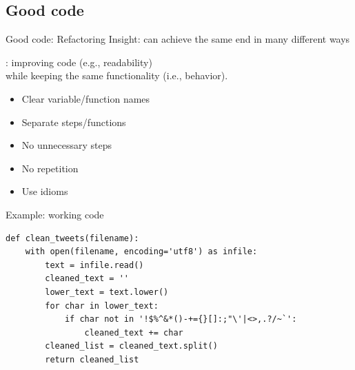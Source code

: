 \documentclass[aspectratio=169,usenames,dvipsnames]{beamer}
\begin{document}
\subsection{Good code}
\begin{frame}{Good code: Refactoring}
    Insight: can achieve the same end in many different ways

    \pause
    \begin{definition}
        : improving code (e.g., readability) \\
            while keeping the same functionality (i.e., behavior).
    \end{definition}

    \begin{itemize}
        \item Clear variable/function names
        \item Separate steps/functions
        \item No unnecessary steps
        \item No repetition
        \item Use idioms
    \end{itemize}
\end{frame}

\begin{frame}[fragile]{Example: working code}
\begin{lstlisting}
def clean_tweets(filename):
    with open(filename, encoding='utf8') as infile:
        text = infile.read()
        cleaned_text = ''
        lower_text = text.lower()
        for char in lower_text:
            if char not in '!$%^&*()-+={}[]:;"\'|<>,.?/~`':
                cleaned_text += char
        cleaned_list = cleaned_text.split()
        return cleaned_list
\end{lstlisting}
\end{frame}
\end{document}

